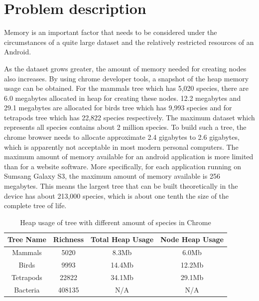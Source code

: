 \documentclass[MSc]{icldt}
\begin{document}
\section{Problem description}

Memory is an important factor that needs to be considered under the circumstances of a quite large dataset and the relatively restricted resources of an Android.

As the dataset grows greater, the amount of memory needed for creating nodes also increases. By using chrome developer tools,  a snapshot of the heap memory usage can be obtained. For the mammals tree which has 5,020 species, there are 6.0 megabytes allocated in heap for creating these nodes. 12.2 megabytes and 29.1 megabytes are allocated for birds tree which has 9,993 species and for tetrapods tree which has 22,822 species respectively. The maximum dataset which represents all species contains about 2 million species. To build such a tree, the chrome browser needs to allocate approximate 2.4 gigabytes to 2.6 gigabytes, which is apparently not acceptable in most modern personal computers. The maximum amount of memory available for an android application is more limited than for a website software. More specifically, for each application running on Sumsang Galaxy S3, the maximum amount of memory available is 256 megabytes. This means the largest tree that can be built theoretically in the device has about 213,000 species, which is about one tenth the size of the complete tree of life.
\begin{table} [H]
	\centering %
	\begin{tabular}{|c c c c|} %
		\hline %
		Tree Name & Richness  &  Total Heap Usage & Node Heap Usage\\%
		\hline  %
		Mammals & 5020 &  8.3Mb & 6.0Mb\\  %
		\hline
		Birds & 9993 &  14.4Mb & 12.2Mb\\
		\hline
		Tetrapods & 22822 & 34.1Mb & 29.1Mb\\ 
		\hline %
		Bacteria & 408135 & N/A & N/A \\ [1ex] %
		\hline
	\end{tabular}
	\label{table:nonlin} %
	\caption{Heap usage of tree with different amount of species in Chrome} %
\end{table}
\end{document}
